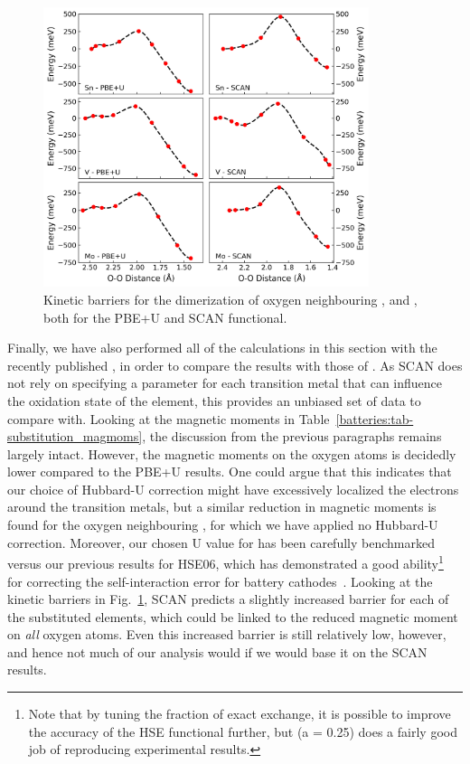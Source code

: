 \begin{refsection}
\newpage
\begin{figure}[ht] 
\centering 
\captionsetup{width=0.9\linewidth}
\includegraphics[width=0.85\textwidth]{figures/batteries/substitution_dimers.png} 
\caption{Kinetic barriers for the dimerization of oxygen neighbouring , 
 and , both for the PBE+U and SCAN functional.} 
\label{batteries:fig-substitution_dimers} 
\end{figure} 
 
Finally, we have also performed all of the calculations in this section with 
the recently published , in order to compare the results with 
those of . As SCAN does not rely on specifying a parameter for each 
transition metal that can influence the oxidation state of the element, this 
provides an unbiased set of data to compare with. Looking at the magnetic 
moments in Table~\ref{batteries:tab-substitution_magmoms}, the discussion from 
the previous paragraphs remains largely intact. However, the magnetic moments 
on the oxygen atoms is decidedly lower compared to the PBE+U results. One 
could argue that this indicates that our choice of Hubbard-U correction might 
have excessively localized the electrons around the transition metals, but a 
similar reduction in magnetic moments is found for the oxygen neighbouring 
, for which we have applied no Hubbard-U correction. Moreover, our 
chosen U value for  has been carefully benchmarked versus our previous 
results for HSE06, which has demonstrated a good ability\footnote{Note that by 
tuning the fraction of exact exchange, it is possible to improve the accuracy 
of the HSE functional further, but  (a = 0.25) does a fairly good job of 
reproducing experimental results.} for correcting the self-interaction error for 
battery cathodes~\cite{Seo2015}. Looking at the kinetic barriers in 
Fig.~\ref{batteries:fig-substitution_dimers}, SCAN predicts a slightly 
increased barrier for each of the substituted elements, which could be linked 
to the reduced magnetic moment on \textit{all} oxygen atoms. Even this 
increased barrier is still relatively low, however, and hence not much of our 
analysis would if we would base it on the SCAN results. 


\end{refsection}
